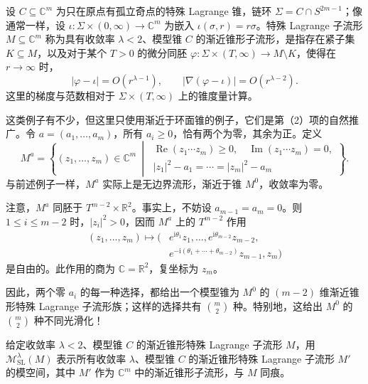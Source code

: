 \begin{definition*}\label{def:7.ac-special-lagrangian}
设 $C\subseteq\mathbb C^m$ 为只在原点有孤立奇点的特殊 Lagrange 锥，链环 $\Sigma=C\cap S^{2m-1}$；像通常一样，设 $\iota\colon\Sigma\times(0,\infty)\to\mathbb C^m$ 为嵌入 $\iota(\sigma,r)=r\sigma$。特殊 Lagrange 子流形 $M\subseteq\mathbb C^m$ 称为具有收敛率 $\lambda<2$、模型锥 $C$ 的渐近锥形子流形，是指存在紧子集 $K\subseteq M$，以及对于某个 $T>0$ 的微分同胚 $\varphi\colon\Sigma\times(T,\infty)\to M\setminus K$，使得在 $r\to\infty$ 时，
\[
|\varphi-\iota|=O(r^{\lambda-1}),\qquad
|\nabla(\varphi-\iota)|=O(r^{\lambda-2}).
\]
这里的梯度与范数相对于 $\Sigma\times(T,\infty)$ 上的锥度量计算。
\end{definition*}

\begin{example}\label{ex:7.17}
这类例子有不少，但这里只使用渐近于环面锥的例子，它们是第（2）项的自然推广。令 $a=(a_1,\ldots,a_m)$，所有 $a_i\geq0$，恰有两个为零，其余为正。定义
\[
M^a=\left\{(z_1,\ldots,z_m)\in\mathbb C^m\ \middle|\
\begin{gathered}
\operatorname{Re}(z_1\cdots z_m)\geq0,
\quad\operatorname{Im}(z_1\cdots z_m)=0,\\
|z_1|^2-a_1=\cdots=|z_m|^2-a_m
\end{gathered}\right\}.
\]
与前述例子一样，$M^a$ 实际上是无边界流形，渐近于锥 $M^0$，收敛率为零。

注意，$M^a$ 同胚于 $T^{m-2}\times\mathbb R^2$。事实上，不妨设 $a_{m-1}=a_m=0$。则 $1\leq i\leq m-2$ 时，$|z_i|^2>0$，因而 $M^a$ 上的 $T^{m-2}$ 作用
\[
\begin{split}
(z_1,\ldots,z_m)\longmapsto
\bigl(&e^{\mathrm i\theta_1}z_1,\ldots,
e^{\mathrm i\theta_{m-2}}z_{m-2},\\
&e^{-\mathrm i(\theta_1+\cdots+\theta_{m-2})}z_{m-1},z_m\bigr)
\end{split}
\]
是自由的。此作用的商为 $\mathbb C=\mathbb R^2$，复坐标为 $z_m$。

因此，两个零 $a_i$ 的每一种选择，都给出一个模型锥为 $M^0$ 的 $(m-2)$ 维渐近锥形特殊 Lagrange 子流形族；这样的选择共有 $\binom m2$ 种。特别地，这给出 $M^0$ 的 $\binom m2$ 种不同光滑化！
\end{example}

给定收敛率 $\lambda<2$、模型锥 $C$ 的渐近锥形特殊 Lagrange 子流形 $M$，用 $\mathcal M_{\mathrm{SL}}^\lambda(M)$ 表示所有收敛率 $\lambda$、模型锥 $C$ 的渐近锥形特殊 Lagrange 子流形 $M'$ 的模空间，其中 $M'$ 作为 $\mathbb C^m$ 中的渐近锥形子流形，与 $M$ 同痕。

